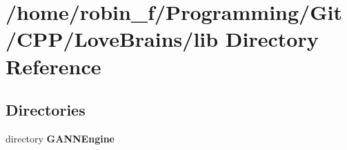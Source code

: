 \section{/home/robin\+\_\+f/\+Programming/\+Git/\+C\+P\+P/\+Love\+Brains/lib Directory Reference}
\label{dir_0c7ebee9e2b481961772df7a03a28462}
\subsection*{Directories}
\begin{DoxyCompactItemize}
\item 
directory {\bf G\+A\+N\+N\+Engine}
\end{DoxyCompactItemize}
